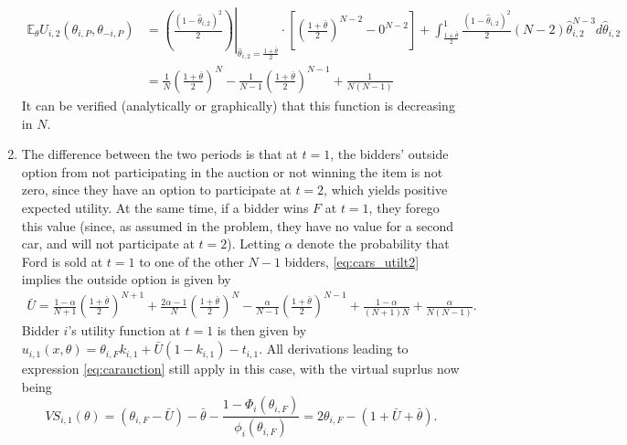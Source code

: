 \documentclass[a4paper]{article}
\begin{document}
\begin{enumerate}
\begin{align}
		\mathbb{E}_\theta U_{i,2}(\theta_{i,P},\theta_{-i,P}) &= \left.\left( \frac{(1-\hat{\theta}_{i,2})^2}{2} \right) \right|_{\hat{\theta}_{i,2}=\frac{1+\bar{\theta}}{2}} \cdot \left[ \left(\frac{1+\bar{\theta}}{2}\right)^{N-2} - 0^{N-2} \right]
		+ \int_{\frac{1+\bar{\theta}}{2}}^1 \frac{(1-\hat{\theta}_{i,2})^2}{2} (N-2) \hat{\theta}_{i,2}^{N-3} d \hat{\theta}_{i,2}
		\nonumber
		\\
		&= \frac{1}{N} \left(\frac{1+\bar{\theta}}{2}\right)^N - \frac{1}{N-1} \left(\frac{1+\bar{\theta}}{2}\right)^{N-1} + \frac{1}{N(N-1)}
		\label{eq:cars_utilt2}
	\end{align}
	It can be verified (analytically or graphically) that this function is decreasing in $N$.
	
	\item The difference between the two periods is that at $t=1$, the bidders' outside option from not participating in the auction or not winning the item is not zero, since they have an option to participate at $t=2$, which yields positive expected utility. At the same time, if a bidder wins $F$ at $t=1$, they forego this value (since, as assumed in the problem, they have no value for a second car, and will not participate at $t=2$).
	Letting $\alpha$ denote the probability that Ford is sold at $t=1$ to one of the other $N-1$ bidders, \eqref{eq:cars_utilt2} implies the outside option is given by
	\begin{align*}
		\bar{U} = \frac{1-\alpha}{N+1} \left(\frac{1+\bar{\theta}}{2}\right)^{N+1} + \frac{2\alpha - 1}{N} \left(\frac{1+\bar{\theta}}{2}\right)^N - \frac{\alpha}{N-1} \left(\frac{1+\bar{\theta}}{2}\right)^{N-1} + \frac{1-\alpha}{(N+1)N} + \frac{\alpha}{N(N-1)}.
	\end{align*}
	Bidder $i$'s utility function at $t=1$ is then given by $u_{i,1}(x,\theta) = \theta_{i,F} k_{i,1} + \bar{U}(1-k_{i,1}) - t_{i,1}$.
	All derivations leading to expression \eqref{eq:carauction} still apply in this case, with the virtual suprlus now being $$VS_{i,1}(\theta) = (\theta_{i,F}-\bar{U}) - \bar{\theta} - \frac{1-\Phi_i(\theta_{i,F})}{\phi_i(\theta_{i,F})} = 2\theta_{i,F} - (1+\bar{U}+\bar{\theta}).$$ 

\end{enumerate}
\end{document}
